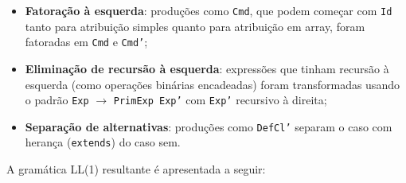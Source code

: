 \documentclass[a4paper, 12pt]{article}
\begin{document}
\begin{itemize}
    \item \textbf{Fatora\c{c}\~ao \`a esquerda}: produ\c{c}\~oes como \texttt{Cmd}, que podem come\c{c}ar com \texttt{Id} tanto para atribui\c{c}\~ao simples quanto para atribui\c{c}\~ao em array, foram fatoradas em \texttt{Cmd} e \texttt{Cmd'};
    \item \textbf{Elimina\c{c}\~ao de recurs\~ao \`a esquerda}: express\~oes que tinham recurs\~ao \`a esquerda (como opera\c{c}\~oes bin\'arias encadeadas) foram transformadas usando o padr\~ao \texttt{Exp} $\rightarrow$ \texttt{PrimExp Exp'} com \texttt{Exp'} recursivo \`a direita;
    \item \textbf{Separa\c{c}\~ao de alternativas}: produ\c{c}\~oes como \texttt{DefCl'} separam o caso com heran\c{c}a (\texttt{extends}) do caso sem.
\end{itemize}

A gram\'atica LL(1) resultante \'e apresentada a seguir:
\end{document}
